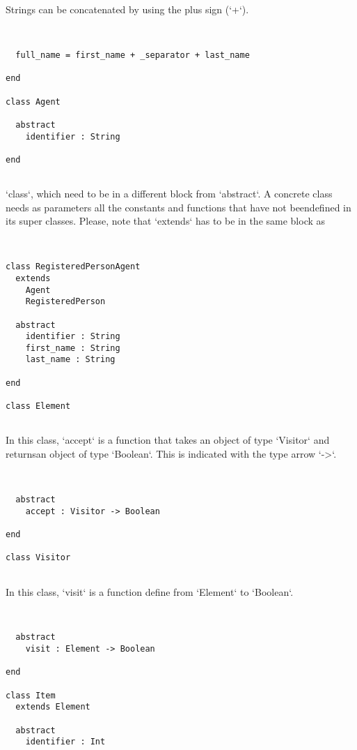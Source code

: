 \documentclass[12pt,a4paper]{article}
\begin{document}
Strings can be concatenated by using the plus sign (`+`). 


\begin{lstlisting}


  full_name = first_name + _separator + last_name

end

class Agent

  abstract
    identifier : String

end


\end{lstlisting}

`class`, which need to be in a different block from `abstract`. A concrete class needs as parameters all the constants and functions that have not beendefined in its super classes. Please, note that `extends` has to be in the same block as


\begin{lstlisting}


class RegisteredPersonAgent
  extends
    Agent
    RegisteredPerson

  abstract
    identifier : String
    first_name : String
    last_name : String

end

class Element


\end{lstlisting}

In this class, `accept` is a function that takes an object of type `Visitor` and returnsan object of type `Boolean`. This is indicated with the type arrow `->`. 


\begin{lstlisting}


  abstract
    accept : Visitor -> Boolean

end

class Visitor


\end{lstlisting}

In this class, `visit` is a function define from `Element` to `Boolean`. 


\begin{lstlisting}


  abstract
    visit : Element -> Boolean

end

class Item
  extends Element

  abstract
    identifier : Int


\end{lstlisting}
\end{document}
